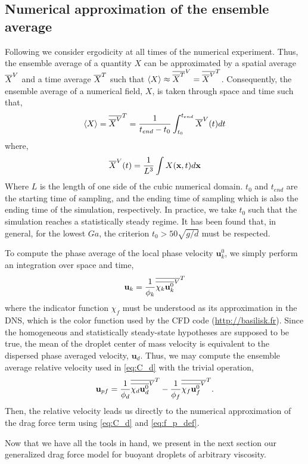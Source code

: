 \subsection{Numerical approximation of the ensemble average}

Following \citet{du2022analysis} we consider ergodicity at all times of the numerical experiment.
Thus, the ensemble average of a quantity $X$ can be approximated by a spatial average $\overline{X}^V$ and a time average $\overline{X}^T$ such that $\left<X\right> \approx \overline{\overline{X}^T}^V = \overline{\overline{X}^V}^T$.
Consequently, the ensemble average of a numerical field, $X$, is taken through space and time such that,
\begin{equation}
    \left<X\right>
    = \overline{\overline{X}^V}^T
    = \frac{1}{ t_{end} - t_0}\int_{t_0}^{t_{end}} 
    \overline{X}^V(t) dt
\end{equation}
where, 
\begin{equation}
    \overline{X}^V(t)
    = \frac{1}{L^3}\int 
    X(\textbf{x},t) d\textbf{x}
\end{equation}
Where $L$ is the length of one side of the cubic numerical domain.
$t_0$ and $t_{end}$ are the starting time of sampling, and the ending time of sampling which is also the ending time of the simulation, respectively.
In practice, we take $t_0$ such that the simulation reaches a statistically steady regime. 
It has been found that, in general, for the lowest $Ga$, the criterion $t_0 > 50\sqrt{g/d}$ must be respected.  

To compute the phase average of the local phase velocity $\textbf{u}_k^0$, we simply perform an integration over space and time, 
\begin{equation}
    \textbf{u}_k = \frac{1}{\phi_k} \overline{\overline{\chi_k \textbf{u}_k^0}^V}^T
\end{equation}
where the indicator function $\chi_f$ must be understood as its approximation in the DNS, which is the color function used by the CFD code (\url{http://basilisk.fr}). 
Since the homogeneous and statistically steady-state hypotheses are supposed to be true, the mean of the droplet center of mass velocity is equivalent to the dispersed phase averaged velocity, $\textbf{u}_d$.
Thus, we may compute the ensemble average relative velocity used in \ref{eq:C_d} with the trivial operation, 
\begin{equation}
    \textbf{u}_{pf} = 
    \frac{1}{\phi_d} \overline{\overline{\chi_d \textbf{u}_d^0}^V}^T
    - \frac{1}{\phi_f} \overline{\overline{\chi_f \textbf{u}_f^0}^V}^T. 
\end{equation} 
Then, the relative velocity leads us directly to the numerical approximation of the drag force term using \ref{eq:C_d} and \ref{eq:f_p_def}. 

Now that we have all the tools in hand, we present in the next section our generalized drag force model for buoyant droplets of arbitrary viscosity. 